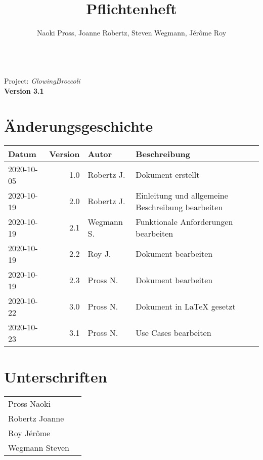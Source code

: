 \documentclass[a4paper, twosided, 11pt]{scrartcl}
\title{Pflichtenheft}
\author{Naoki Pross, Joanne Robertz, Steven Wegmann, J\'er\^ome Roy}
\begin{document}
\begin{titlepage}
  \begin{flushright}
    \vspace{5cm}
    {\Huge \bfseries \thetitle} \\
    \vspace{5mm}
    {\LARGE Project: \textit{GlowingBroccoli}} \\
    \vspace{5mm}
    {\LARGE \bfseries Version 3.1}
  \end{flushright}
\end{titlepage}


\clearpage
\section*{\"Anderungsgeschichte}
\begin{tabularx}{\textwidth}{lrlX}
  \toprule
  \bfseries Datum & \bfseries Version & \bfseries Autor & \bfseries Beschreibung \\
  \midrule
  2020-10-05 & 1.0 & Robertz J. & Dokument erstellt \\
  2020-10-19 & 2.0 & Robertz J. & Einleitung und allgemeine Beschreibung bearbeiten \\
  2020-10-19 & 2.1 & Wegmann S.  & Funktionale Anforderungen bearbeiten \\
  2020-10-19 & 2.2 & Roy J.     & Dokument bearbeiten \\
  2020-10-19 & 2.3 & Pross N.   & Dokument bearbeiten \\
  2020-10-22 & 3.0 & Pross N.   & Dokument in \textrm{\LaTeX} gesetzt \\
  2020-10-23 & 3.1 & Pross N.   & Use Cases bearbeiten \\
  \bottomrule
\end{tabularx}

\vfill
\section*{Unterschriften}
{
  \renewcommand{\arraystretch}{2}
  \begin{tabular}{lp{}}
    Pross Naoki    & \hrulefill \\
    Robertz Joanne & \hrulefill \\
    Roy J\'er\^ome & \hrulefill \\
    Wegmann Steven & \hrulefill \\
  \end{tabular}
}
\end{document}
